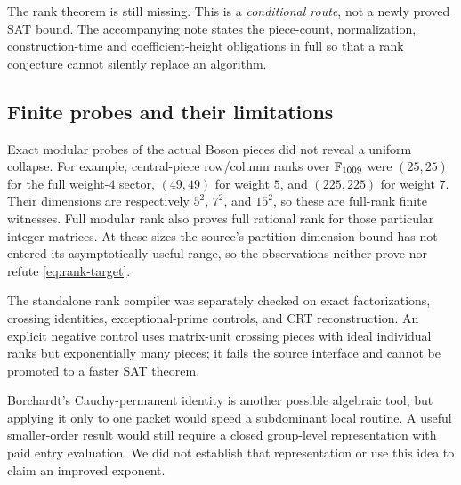 The rank theorem is still missing. This is a \emph{conditional route}, not
a newly proved SAT bound. The accompanying note states the piece-count,
normalization, construction-time and coefficient-height obligations in
full so that a rank conjecture cannot silently replace an algorithm.

\subsection{Finite probes and their limitations}

Exact modular probes of the actual Boson pieces did not reveal a uniform
collapse. For example, central-piece row/column ranks over $\mathbb F_{1009}$
were $(25,25)$ for the full weight-$4$ sector, $(49,49)$ for weight $5$,
and $(225,225)$ for weight $7$. Their dimensions are respectively
$5^2$, $7^2$, and $15^2$, so these are full-rank finite witnesses.
Full modular rank also proves full rational rank for those particular
integer matrices. At these sizes the source's partition-dimension bound
has not entered its asymptotically useful range, so the observations
neither prove nor refute \eqref{eq:rank-target}.

The standalone rank compiler was separately checked on exact factorizations,
crossing identities, exceptional-prime controls, and CRT reconstruction.
An explicit negative control uses matrix-unit crossing pieces with ideal
individual ranks but exponentially many pieces; it fails the source
interface and cannot be promoted to a faster SAT theorem.

Borchardt's Cauchy-permanent identity is another possible algebraic tool,
but applying it only to one packet would speed a subdominant local routine.
A useful smaller-order result would still require a closed group-level
representation with paid entry evaluation. We did not establish that
representation or use this idea to claim an improved exponent.
